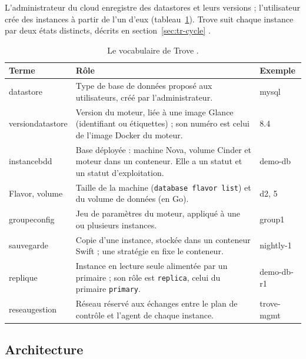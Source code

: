 L'administrateur du cloud enregistre des \glspl{datastore} et leurs versions ; l'utilisateur crée des instances à partir de l'un
d'eux (tableau~\ref{tab:tr-objets}). Trove suit chaque instance par deux états distincts, décrits en section~\ref{sec:tr-cycle}
\parencite{trove-datastore,trove-status}.

\begin{table}[!ht]
\centering
\renewcommand{\arraystretch}{1.3}
\begin{tabular}{@{}>{\raggedright\arraybackslash}p{3.5cm}>{\raggedright\arraybackslash}p{8.5cm}>{\raggedright\arraybackslash\ttfamily\small}p{3.5cm}@{}}
\toprule
\textbf{Terme} & \textbf{Rôle} & \textrm{\textbf{Exemple}} \\
\midrule
\Gls{datastore} & Type de base de données proposé aux utilisateurs, créé par l'administrateur. & mysql \\
\Gls{versiondatastore} & Version du moteur, liée à une image Glance (identifiant ou étiquettes) ; son numéro est celui de l'image Docker du moteur. & 8.4 \\
\Gls{instancebdd} & Base déployée : machine Nova, volume Cinder et moteur dans un conteneur. Elle a un statut et un statut d'exploitation. & demo-db \\
Flavor, volume & Taille de la machine (\texttt{database flavor list}) et du volume de données (en Go). & d2, 5 \\
\Gls{groupeconfig} & Jeu de paramètres du moteur, appliqué à une ou plusieurs instances. & group1 \\
\Gls{sauvegarde} & Copie d'une instance, stockée dans un conteneur Swift ; une stratégie en fixe le conteneur. & nightly-1 \\
\Gls{replique} & Instance en lecture seule alimentée par un primaire ; son rôle est \texttt{replica}, celui du primaire \texttt{primary}. & demo-db-r1 \\
\Gls{reseaugestion} & Réseau réservé aux échanges entre le plan de contrôle et l'agent de chaque instance. & trove-mgmt \\
\bottomrule
\end{tabular}
\caption{Le vocabulaire de Trove \parencite{trove-datastore,trove-create,trove-production}.}
\label{tab:tr-objets}
\end{table}

\subsection{Architecture}\label{sec:tr-archi}

